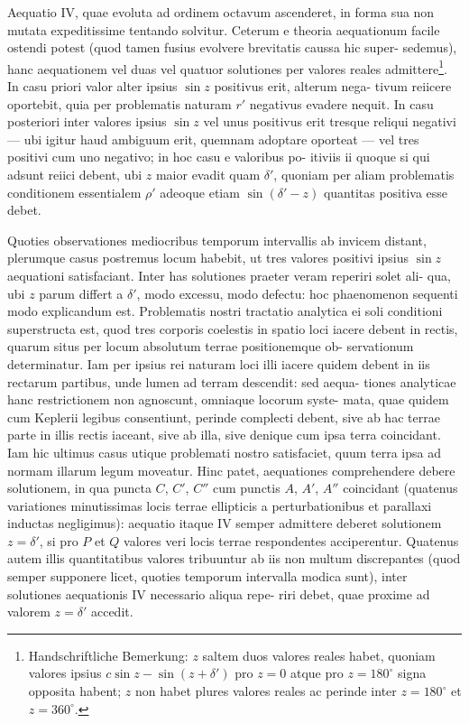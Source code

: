 \documentclass[12pt,a4paper]{article}
\begin{document}
Aequatio IV, quae evoluta ad ordinem octavum ascenderet, in forma sua
non mutata expeditissime tentando solvitur. Ceterum e theoria aequationum
facile ostendi potest (quod tamen fusius evolvere brevitatis caussa hic super-
sedemus), hanc aequationem vel duas vel quatuor solutiones per valores reales
admittere\footnote{Handschriftliche Bemerkung: $z$ saltem duos valores reales habet, quoniam valores ipsius
$c\sin z - \sin(z + \delta')$ pro $z = 0$ atque pro $z = 180^\circ$ signa opposita habent; $z$ non habet plures valores reales
ac perinde inter $z = 180^\circ$ et $z = 360^\circ$.}.
In casu priori valor alter ipsius $\sin z$ positivus erit, alterum nega-
tivum reiicere oportebit, quia per problematis naturam $r'$ negativus evadere
nequit. In casu posteriori inter valores ipsius $\sin z$ vel unus positivus erit
tresque reliqui negativi --- ubi igitur haud ambiguum erit, quemnam adoptare
oporteat --- vel tres positivi cum uno negativo; in hoc casu e valoribus po-
itiviis ii quoque si qui adsunt reiici debent, ubi $z$ maior evadit quam $\delta'$,
quoniam per aliam problematis conditionem essentialem $\rho'$ adeoque etiam
$\sin(\delta' - z)$ quantitas positiva esse debet.

Quoties observationes mediocribus temporum intervallis ab invicem distant,
plerumque casus postremus locum habebit, ut tres valores positivi ipsius $\sin z$
aequationi satisfaciant. Inter has solutiones praeter veram reperiri solet ali-
qua, ubi $z$ parum differt a $\delta'$, modo excessu, modo defectu: hoc phaenomenon
sequenti modo explicandum est. Problematis nostri tractatio analytica ei soli
conditioni superstructa est, quod tres corporis coelestis in spatio loci iacere
debent in rectis, quarum situs per locum absolutum terrae positionemque ob-
servationum determinatur. Iam per ipsius rei naturam loci illi iacere quidem
debent in iis rectarum partibus, unde lumen ad terram descendit: sed aequa-
tiones analyticae hanc restrictionem non agnoscunt, omniaque locorum syste-
mata, quae quidem cum Keplerii legibus consentiunt, perinde complecti debent,
sive ab hac terrae parte in illis rectis iaceant, sive ab illa, sive denique cum ipsa
terra coincidant. Iam hic ultimus casus utique problemati nostro satisfaciet,
quum terra ipsa ad normam illarum legum moveatur. Hinc patet, aequationes
comprehendere debere solutionem, in qua puncta $C$, $C'$, $C''$ cum punctis $A$, $A'$,
$A''$ coincidant (quatenus variationes minutissimas locis terrae ellipticis a
perturbationibus et parallaxi inductas negligimus): aequatio itaque IV semper
admittere deberet solutionem $z = \delta'$, si pro $P$ et $Q$ valores veri locis terrae
respondentes acciperentur. Quatenus autem illis quantitatibus valores tribuuntur
ab iis non multum discrepantes (quod semper supponere licet, quoties temporum
intervalla modica sunt), inter solutiones aequationis IV necessario aliqua repe-
riri debet, quae proxime ad valorem $z = \delta'$ accedit.
\end{document}
